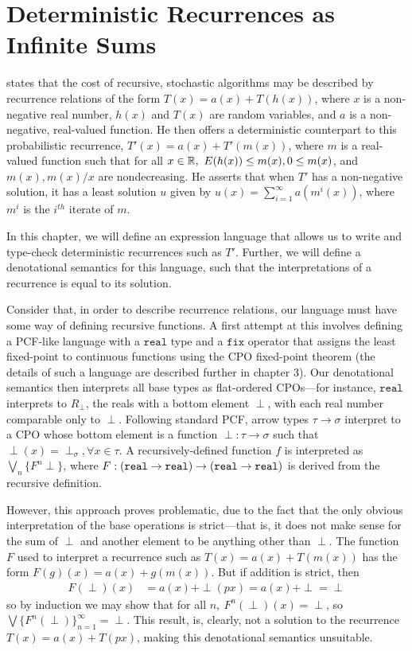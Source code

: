 \chapter{Deterministic Recurrences as Infinite Sums}
\cite[\S1]{Karp} states that the  cost of recursive, stochastic algorithms may 
be described by recurrence relations of the form $T(x) = a(x) + T(h(x))$, where $x$ is a non-negative real number, $h(x)$ 
and $T(x)$ are 
random variables, and $a$ is a non-negative, real-valued function. He then offers a deterministic counterpart to this
probabilistic recurrence, $T'(x) = a(x) + T'(m(x))$, where $m$ is a real-valued function such that for all
$ x \in \mathbb{R}, \ E(h(x)) \leq m(x) , 0 \leq m(x)$, and $m(x), m(x)/x$ are nondecreasing. He asserts that when $T'$ has a
non-negative solution, it has a least solution $u$ given by $u(x) = \sum_{i=1}^{\infty}a(m^i(x))$, where 
$m^i$ is the $i^{th}$ iterate of $m$. 

In this chapter, we will define an expression language that allows us to write and type-check
deterministic recurrences such as $T'$. Further, we will define a denotational semantics for this language, 
such that the interpretations of a recurrence is equal to its solution. 

Consider that, in order to describe recurrence relations, our language must have some way of defining recursive functions.
A first attempt at this involves defining a PCF-like language with a $\texttt{real}$ type and a $\texttt{fix}$ operator
that assigns the least fixed-point to continuous functions using the CPO fixed-point theorem
(the details of such a language are described further in chapter 3). Our denotational semantics 
then interprets all base types as flat-ordered CPOs---for instance, $\texttt{real}$  interprets to $R_{\perp}$, the reals with a 
bottom element $\perp$, with each real number comparable only to $\perp$. Following standard PCF, arrow types
$\tau \rightarrow \sigma$ interpret to a CPO whose bottom element is a function $\perp: \tau \rightarrow \sigma$ such
that $\perp(x) = \perp_{\sigma}, \forall x \in \tau$. A recursively-defined function $f$ is interpreted as 
$\bigvee_n\{F^n \perp\}$, where $F: (\texttt{real} \rightarrow \texttt{real}) \rightarrow (\texttt{real} \rightarrow \texttt{real})$ is derived from
the recursive definition.

However, this approach proves problematic, due to the fact that the only obvious interpretation of the base operations is strict---that is, it does not make sense for the 
sum of $\perp$ and another element to be anything other than $\perp$. The function $F$ used to interpret a recurrence
such as $T(x) = a(x) + T(m(x))$ has the form $F(g)(x) = a(x) + g(m(x))$. But if addition is strict, then 
\begin{align*}
F(\perp)(x) &= a(x) + \perp(px) = a(x) + \perp = \perp 
\end{align*}
so by induction we may show that for all $n, \ F^n(\perp)(x) = \perp$, so $\bigvee\{F^n(\perp)\}^{\infty}_{n=1}  = \perp$. 
This result, is, clearly, not a solution to the recurrence $T(x) = a(x) + T(px)$, making this denotational semantics
unsuitable. 

